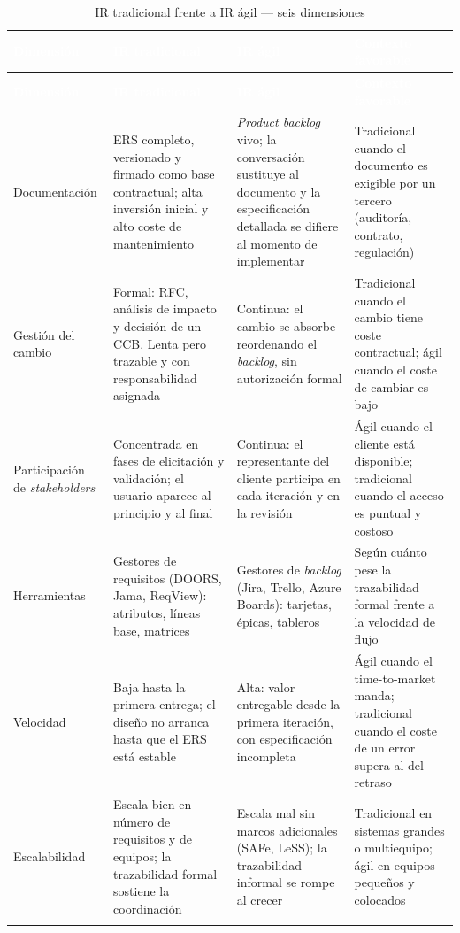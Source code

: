 \documentclass[11pt,letterpaper]{article}
\newcommand{\thead}[1]{\cellcolor{uteqverde}\textcolor{white}{\textbf{#1}}}
\begin{document}
\small
\begin{longtable}{|p{2.4cm}|p{5.2cm}|p{5.2cm}|p{2.6cm}|}
\hline
\thead{Dimensión} & \thead{IR tradicional} & \thead{IR ágil} & \thead{Contexto favorable} \\ \hline
\endfirsthead
\hline
\thead{Dimensión} & \thead{IR tradicional} & \thead{IR ágil} & \thead{Contexto favorable} \\ \hline
\endhead
Documentación & ERS completo, versionado y firmado como base contractual; alta inversión inicial y alto coste de mantenimiento & \emph{Product backlog} vivo; la conversación sustituye al documento y la especificación detallada se difiere al momento de implementar & Tradicional cuando el documento es exigible por un tercero (auditoría, contrato, regulación) \\ \hline
Gestión del cambio & Formal: RFC, análisis de impacto y decisión de un CCB. Lenta pero trazable y con responsabilidad asignada & Continua: el cambio se absorbe reordenando el \emph{backlog}, sin autorización formal & Tradicional cuando el cambio tiene coste contractual; ágil cuando el coste de cambiar es bajo \\ \hline
Participación de \emph{stakeholders} & Concentrada en fases de elicitación y validación; el usuario aparece al principio y al final & Continua: el representante del cliente participa en cada iteración y en la revisión & Ágil cuando el cliente está disponible; tradicional cuando el acceso es puntual y costoso \\ \hline
Herramientas & Gestores de requisitos (DOORS, Jama, ReqView): atributos, líneas base, matrices & Gestores de \emph{backlog} (Jira, Trello, Azure Boards): tarjetas, épicas, tableros & Según cuánto pese la trazabilidad formal frente a la velocidad de flujo \\ \hline
Velocidad & Baja hasta la primera entrega; el diseño no arranca hasta que el ERS está estable & Alta: valor entregable desde la primera iteración, con especificación incompleta & Ágil cuando el time-to-market manda; tradicional cuando el coste de un error supera al del retraso \\ \hline
Escalabilidad & Escala bien en número de requisitos y de equipos; la trazabilidad formal sostiene la coordinación & Escala mal sin marcos adicionales (SAFe, LeSS); la trazabilidad informal se rompe al crecer & Tradicional en sistemas grandes o multiequipo; ágil en equipos pequeños y colocados \\ \hline
\caption{IR tradicional frente a IR ágil --- seis dimensiones}
\end{longtable}
\normalsize
\end{document}
